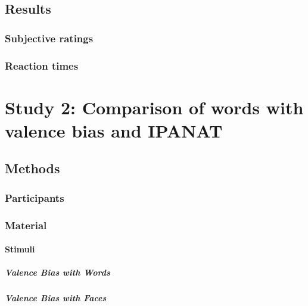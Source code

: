 \documentclass[man]{apa6}
\let\oldparagraph\paragraph
\renewcommand{\paragraph}[1]{\oldparagraph{#1}\mbox{}}
\let\oldsubparagraph\subparagraph
\renewcommand{\subparagraph}[1]{\oldsubparagraph{#1}\mbox{}}
\begin{document}
\hypertarget{results}{%
\subsection{Results}\label{results}}

\hypertarget{subjective-ratings}{%
\subsubsection{Subjective ratings}\label{subjective-ratings}}

\hypertarget{reaction-times}{%
\subsubsection{Reaction times}\label{reaction-times}}

\hypertarget{study-2-comparison-of-words-with-valence-bias-and-ipanat}{%
\section{Study 2: Comparison of words with valence bias and IPANAT}\label{study-2-comparison-of-words-with-valence-bias-and-ipanat}}

\hypertarget{methods-1}{%
\subsection{Methods}\label{methods-1}}

\hypertarget{participants-1}{%
\subsubsection{Participants}\label{participants-1}}

\hypertarget{material-1}{%
\subsubsection{Material}\label{material-1}}

\hypertarget{stimuli-1}{%
\paragraph{Stimuli}\label{stimuli-1}}

\hypertarget{valence-bias-with-words}{%
\subparagraph{Valence Bias with Words}\label{valence-bias-with-words}}

\hypertarget{valence-bias-with-faces}{%
\subparagraph{Valence Bias with Faces}\label{valence-bias-with-faces}}
\end{document}
